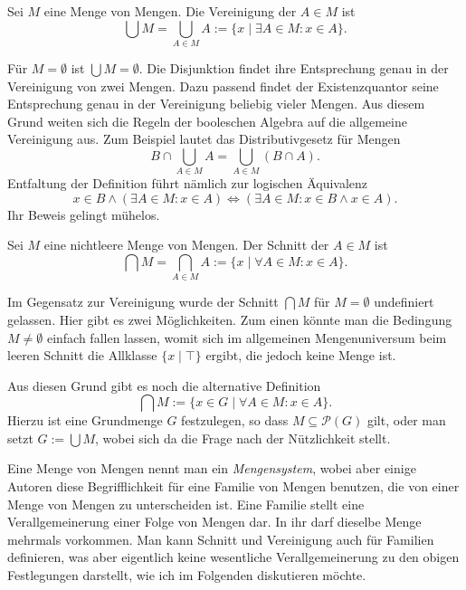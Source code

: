 \begin{Definition}\newlinefirst
Sei $M$ eine Menge von Mengen. Die Vereinigung der $A\in M$ ist
\[\bigcup M = \bigcup_{A\in M} A := \{x\mid\exists A\in M\colon x\in A\}.\]
\end{Definition}
Für $M=\emptyset$ ist $\bigcup M = \emptyset$. Die Disjunktion findet
ihre Entsprechung genau in der Vereinigung
von zwei Mengen. Dazu passend findet der Existenzquantor seine
Entsprechung genau in der Vereinigung beliebig vieler Mengen.
Aus diesem Grund weiten sich die Regeln der booleschen Algebra
auf die allgemeine Vereinigung aus. Zum Beispiel lautet das
Distributivgesetz für Mengen%
\[B\cap\bigcup_{A\in M} A = \bigcup_{A\in M}(B\cap A).\]
Entfaltung der Definition führt nämlich zur logischen Äquivalenz
\[x\in B\land(\exists A\in M\colon x\in A) \iff (\exists A\in M\colon x\in B\land x\in A).\]
Ihr Beweis gelingt mühelos.

\begin{Definition}\newlinefirst
Sei $M$ eine nichtleere Menge von Mengen. Der Schnitt der $A\in M$ ist%
\[\bigcap M = \bigcap_{A\in M} A := \{x\mid\forall A\in M\colon x\in A\}.\]
\end{Definition}
Im Gegensatz zur Vereinigung wurde der Schnitt $\bigcap M$ 
für $M=\emptyset$ undefiniert gelassen. Hier gibt es zwei Möglichkeiten.
Zum einen könnte man die Bedingung $M\ne\emptyset$ einfach fallen
lassen, womit sich im allgemeinen Mengenuniversum beim leeren
Schnitt die Allklasse $\{x\mid\top\}$ ergibt, die jedoch keine Menge ist.

Aus diesen Grund gibt es noch die alternative Definition
\[\bigcap M :=
\{x\in G\mid\forall A\in M\colon x\in A\}.\]
Hierzu ist eine Grundmenge $G$ festzulegen, so dass $M\subseteq\mathcal P(G)$
gilt, oder man setzt $G:=\bigcup M$, wobei sich da die Frage
nach der Nützlichkeit stellt.

Eine Menge von Mengen nennt man ein \emph{Mengensystem},
wobei aber einige Autoren diese Begrifflichkeit für eine Familie von
Mengen benutzen, die von einer Menge von Mengen zu unterscheiden ist.
Eine Familie stellt eine Verallgemeinerung einer Folge von Mengen dar.
In ihr darf dieselbe Menge mehrmals vorkommen. Man kann Schnitt und
Vereinigung auch für Familien definieren, was aber eigentlich keine
wesentliche Verallgemeinerung zu den obigen Festlegungen darstellt,
wie ich im Folgenden diskutieren möchte.

